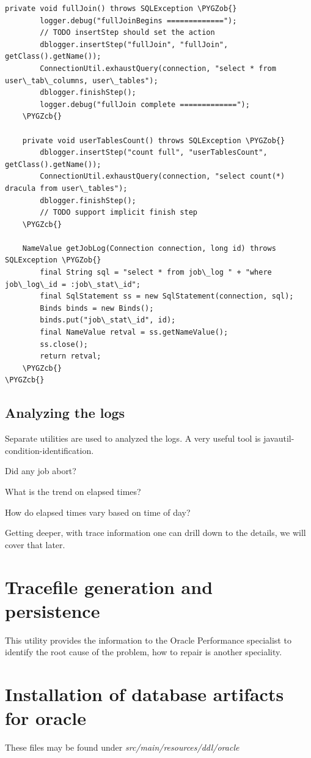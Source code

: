 \documentclass[letterpaper,10pt,english]{sphinxmanual}
\def\PYGZob{\char`\{}
\def\PYGZcb{\char`\}}
\begin{document}
\begin{Verbatim}[commandchars=\\\{\}]
    private void fullJoin() throws SQLException \PYGZob{}
        logger.debug("fullJoinBegins =============");
        // TODO insertStep should set the action
        dblogger.insertStep("fullJoin", "fullJoin", getClass().getName());
        ConnectionUtil.exhaustQuery(connection, "select * from user\_tab\_columns, user\_tables");
        dblogger.finishStep();
        logger.debug("fullJoin complete =============");
    \PYGZcb{}

    private void userTablesCount() throws SQLException \PYGZob{}
        dblogger.insertStep("count full", "userTablesCount", getClass().getName());
        ConnectionUtil.exhaustQuery(connection, "select count(*) dracula from user\_tables");
        dblogger.finishStep();
        // TODO support implicit finish step
    \PYGZcb{}

    NameValue getJobLog(Connection connection, long id) throws SQLException \PYGZob{}
        final String sql = "select * from job\_log " + "where job\_log\_id = :job\_stat\_id";
        final SqlStatement ss = new SqlStatement(connection, sql);
        Binds binds = new Binds();
        binds.put("job\_stat\_id", id);
        final NameValue retval = ss.getNameValue();
        ss.close();
        return retval;
    \PYGZcb{}
\PYGZcb{}
\end{Verbatim}


\section{Analyzing the logs}
\label{index:analyzing-the-logs}
Separate utilities are used to analyzed the logs. A very useful tool is
javautil-condition-identification.

Did any job abort?

What is the trend on elapsed times?

How do elapsed times vary based on time of day?

Getting deeper, with trace information one can drill down to the
details, we will cover that later.


\chapter{Tracefile generation and persistence}
\label{index:tracefile-generation-and-persistence}
This utility provides the information to the Oracle Performance
specialist to identify the root cause of the problem, how to repair is
another speciality.


\chapter{Installation of database artifacts for oracle}
\label{index:installation-of-database-artifacts-for-oracle}
These files may be found under \emph{src/main/resources/ddl/oracle}
\end{document}
